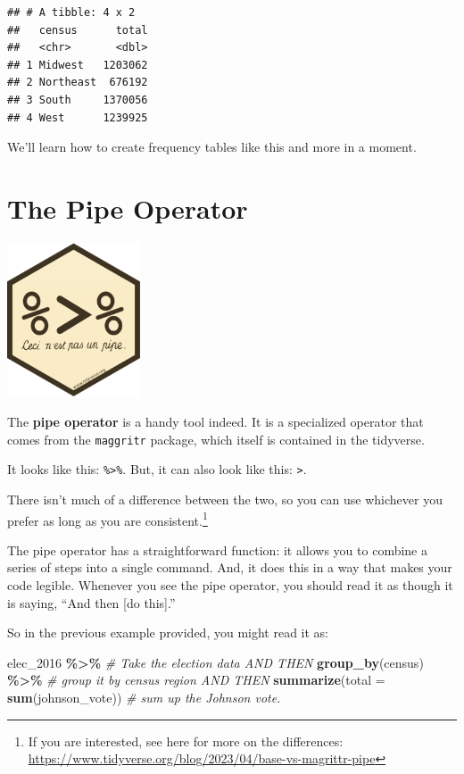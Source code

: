 \documentclass[
]{book}
\newenvironment{Shaded}{\begin{snugshade}}{\end{snugshade}}
\newcommand{\AttributeTok}[1]{\textcolor[rgb]{0.13,0.29,0.53}{#1}}
\newcommand{\CommentTok}[1]{\textcolor[rgb]{0.56,0.35,0.01}{\textit{#1}}}
\newcommand{\FunctionTok}[1]{\textcolor[rgb]{0.13,0.29,0.53}{\textbf{#1}}}
\newcommand{\NormalTok}[1]{#1}
\newcommand{\SpecialCharTok}[1]{\textcolor[rgb]{0.81,0.36,0.00}{\textbf{#1}}}
\begin{document}
\begin{verbatim}
## # A tibble: 4 x 2
##   census      total
##   <chr>       <dbl>
## 1 Midwest   1203062
## 2 Northeast  676192
## 3 South     1370056
## 4 West      1239925
\end{verbatim}

We'll learn how to create frequency tables like this and more in a moment.

\hypertarget{the-pipe-operator}{%
\section{The Pipe Operator}\label{the-pipe-operator}}

\includegraphics[width=1.55208in,height=\textheight]{docs/_main_files/figure-html/ceci_pipe.png}

The \textbf{pipe operator} is a handy tool indeed. It is a specialized operator that comes from the \texttt{maggritr} package, which itself is contained in the tidyverse.

It looks like this: \texttt{\%\textgreater{}\%}. But, it can also look like this: \texttt{\textbar{}\textgreater{}}.

There isn't much of a difference between the two, so you can use whichever you prefer as long as you are consistent.\footnote{If you are interested, see here for more on the differences: \href{https://www.tidyverse.org/blog/2023/04/base-vs-magrittr-pipe/\#}{https://www.tidyverse.org/blog/2023/04/base-vs-magrittr-pipe}}

The pipe operator has a straightforward function: it allows you to combine a series of steps into a single command. And, it does this in a way that makes your code legible. Whenever you see the pipe operator, you should read it as though it is saying, ``And then {[}do this{]}.''

So in the previous example provided, you might read it as:

\begin{Shaded}
\begin{Highlighting}[]
\NormalTok{elec\_2016 }\SpecialCharTok{\%\textgreater{}\%}                            \CommentTok{\# Take the election data AND THEN}
  \FunctionTok{group\_by}\NormalTok{(census) }\SpecialCharTok{\%\textgreater{}\%}                   \CommentTok{\# group it by census region AND THEN}
  \FunctionTok{summarize}\NormalTok{(}\AttributeTok{total =} \FunctionTok{sum}\NormalTok{(johnson\_vote))   }\CommentTok{\# sum up the Johnson vote.}
\end{Highlighting}
\end{Shaded}
\end{document}
